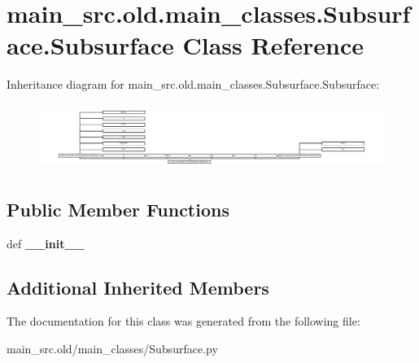 \hypertarget{classmain__src_8old_1_1main__classes_1_1Subsurface_1_1Subsurface}{\section{main\-\_\-src.\-old.\-main\-\_\-classes.\-Subsurface.\-Subsurface Class Reference}
\label{classmain__src_8old_1_1main__classes_1_1Subsurface_1_1Subsurface}
}
Inheritance diagram for main\-\_\-src.\-old.\-main\-\_\-classes.\-Subsurface.\-Subsurface\-:\begin{figure}[H]
\begin{center}
\leavevmode
\includegraphics[height=2.142857cm]{classmain__src_8old_1_1main__classes_1_1Subsurface_1_1Subsurface}
\end{center}
\end{figure}
\subsection*{Public Member Functions}
\begin{DoxyCompactItemize}
\item 
\hypertarget{classmain__src_8old_1_1main__classes_1_1Subsurface_1_1Subsurface_a48943e8eca6405e4bb102620ee8a0913}{def {\bfseries \-\_\-\-\_\-init\-\_\-\-\_\-}}\label{classmain__src_8old_1_1main__classes_1_1Subsurface_1_1Subsurface_a48943e8eca6405e4bb102620ee8a0913}

\end{DoxyCompactItemize}
\subsection*{Additional Inherited Members}


The documentation for this class was generated from the following file\-:\begin{DoxyCompactItemize}
\item 
main\-\_\-src.\-old/main\-\_\-classes/Subsurface.\-py\end{DoxyCompactItemize}
